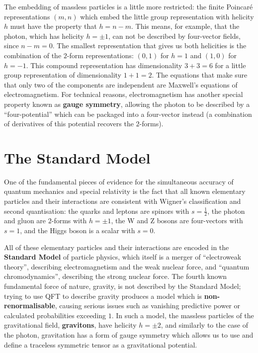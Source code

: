 \documentclass[12pt]{article}
\begin{document}
The embedding of massless particles is a little more restricted: the finite Poincaré representations $\left(m,n\right)$ which embed the little group representation with helicity $h$ must have the property that $h = n - m$. This means, for example, that the photon, which has helicity $h = \pm 1$, can not be described by four-vector fields, since $n - m = 0$. The smallest representation that gives us both helicities is the combination of the $2$-form representations: $\left(0,1\right)$ for $h=1$ and $\left(1,0\right)$ for $h=-1$. This compound representation  has dimensionality $3+3=6$ for a little group representation of dimensionality $1+1=2$. The equations that make sure that only two of the components are independent are Maxwell's equations of electromagnetism. For technical reasons, electromagnetism has another special property known as \textbf{gauge symmetry}, allowing the photon to be described by a ``four-potential'' which can be packaged into a four-vector instead (a combination of derivatives of this potential recovers the $2$-forms).

\section{The Standard Model}

One of the fundamental pieces of evidence for the simultaneous accuracy of quantum mechanics and special relativity is the fact that all known elementary particles and their interactions are consistent with Wigner's classification and second quantisation: the quarks and leptons are spinors with $s=\tfrac{1}{2}$, the photon and gluon are $2$-forms with $h = \pm 1$, the W and Z bosons are four-vectors with $s=1$, and the Higgs boson is a scalar with $s=0$.
\newline

All of these elementary particles and their interactions are encoded in the \textbf{Standard Model} of particle physics, which itself is a merger of ``electroweak theory'', describing electromagnetism and the weak nuclear force, and ``quantum chromodynamics'', describing the strong nuclear force. The fourth known fundamental force of nature, gravity, is not described by the Standard Model; trying to use QFT to describe gravity produces a model which is \textbf{non-renormalisable}, causing serious issues such as vanishing predictive power or calculated probabilities exceeding $1$. In such a model, the massless particles of the gravitational field, \textbf{gravitons}, have helicity $h = \pm 2$, and similarly to the case of the photon, gravitation has a form of gauge symmetry which allows us to use and define a traceless symmetric tensor as a gravitational potential.
\newline
\end{document}
